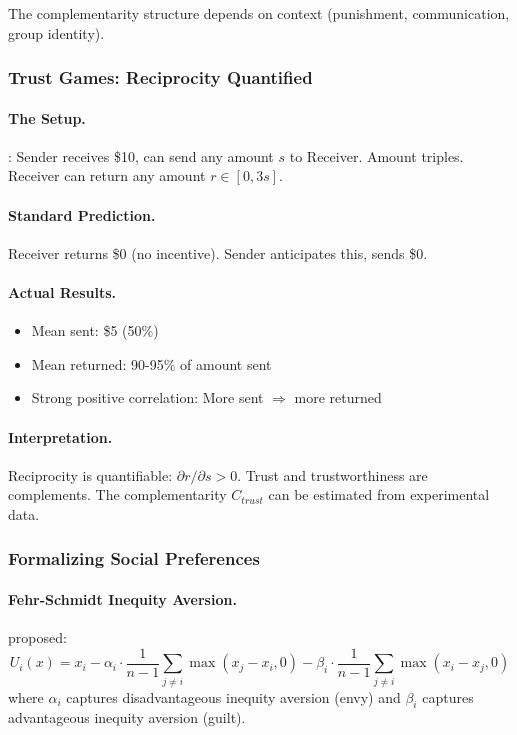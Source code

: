 The complementarity structure depends on context (punishment, communication, group identity).

\subsubsection{Trust Games: Reciprocity Quantified}

\paragraph{The Setup.}
\citet{bergsend1995}: Sender receives \$10, can send any amount $s$ to Receiver.
Amount triples. Receiver can return any amount $r \in [0, 3s]$.

\paragraph{Standard Prediction.}
Receiver returns \$0 (no incentive). Sender anticipates this, sends \$0.

\paragraph{Actual Results.}
\begin{itemize}
  \item Mean sent: \$5 (50\%)
  \item Mean returned: 90-95\% of amount sent
  \item Strong positive correlation: More sent $\Rightarrow$ more returned
\end{itemize}

\paragraph{Interpretation.}
Reciprocity is quantifiable: $\partial r / \partial s > 0$.
Trust and trustworthiness are complements.
The complementarity $C_{trust}$ can be estimated from experimental data.

\subsubsection{Formalizing Social Preferences}

\paragraph{Fehr-Schmidt Inequity Aversion.}
\citet{fehrschmidt} proposed:
\begin{equation}
  U_i(x) = x_i - \alpha_i \cdot \frac{1}{n-1} \sum_{j \neq i} \max(x_j - x_i, 0)
                - \beta_i \cdot \frac{1}{n-1} \sum_{j \neq i} \max(x_i - x_j, 0)
\end{equation}
where $\alpha_i$ captures disadvantageous inequity aversion (envy)
and $\beta_i$ captures advantageous inequity aversion (guilt).

